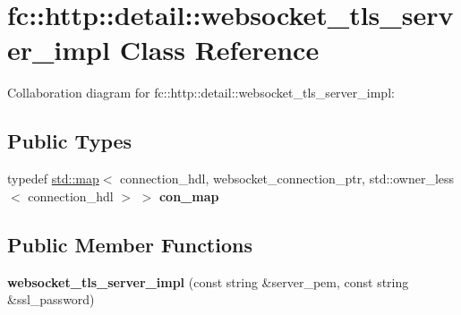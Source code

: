 \hypertarget{classfc_1_1http_1_1detail_1_1websocket__tls__server__impl}{}\section{fc\+:\+:http\+:\+:detail\+:\+:websocket\+\_\+tls\+\_\+server\+\_\+impl Class Reference}
\label{classfc_1_1http_1_1detail_1_1websocket__tls__server__impl}


Collaboration diagram for fc\+:\+:http\+:\+:detail\+:\+:websocket\+\_\+tls\+\_\+server\+\_\+impl\+:
\subsection*{Public Types}
\begin{DoxyCompactItemize}
\item 
\mbox{\label{classfc_1_1http_1_1detail_1_1websocket__tls__server__impl_a96cc287da43a5d64eeaf5d7d70643f96}} 
typedef \mbox{\hyperlink{classstd_1_1map}{std\+::map}}$<$ connection\+\_\+hdl, websocket\+\_\+connection\+\_\+ptr, std\+::owner\+\_\+less$<$ connection\+\_\+hdl $>$ $>$ {\bfseries con\+\_\+map}
\end{DoxyCompactItemize}
\subsection*{Public Member Functions}
\begin{DoxyCompactItemize}
\item 
\mbox{\label{classfc_1_1http_1_1detail_1_1websocket__tls__server__impl_acc0cbb2626f46ac1ffacb54f435c5489}} 
{\bfseries websocket\+\_\+tls\+\_\+server\+\_\+impl} (const string \&server\+\_\+pem, const string \&ssl\+\_\+password)
\end{DoxyCompactItemize}

